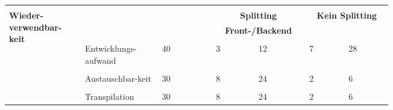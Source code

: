 \documentclass[main.tex]{subfiles} %
\begin{document}
\begin{table}[H]
\begin{tabular}{|p{0.14\linewidth}|p{0.15\linewidth}|p{0.115\linewidth}|p{0.08\linewidth}|p{0.09\linewidth}|p{0.08\linewidth}|p{0.09\linewidth}|}
        \hline
        \hline
                                                           & \multicolumn{2}{c|}{}               & \multicolumn{2}{c|}{}                        & \multicolumn{2}{c|}{}                                                                   \\[-9pt]
        \multirow{6}{4em}{\textbf{Wieder-verwendbar-keit}} & \multicolumn{2}{c|}{}               & \multicolumn{2}{c|}{\textbf{Splitting}}      & \multicolumn{2}{c|}{\textbf{Kein Splitting}}                                            \\[1pt]
                                                           & \multicolumn{2}{c|}{}               & \multicolumn{2}{c|}{\textbf{Front-/Backend}} & \multicolumn{2}{c|}{\textbf{}}                                                          \\[1pt]
        \cline{2-7}
                                                           &                                     &                                              &                                                &             &            &             \\[-9pt]
                                                           & Entwicklungs-aufwand                & 40                                           & 3                                              & 12          & 7          & 28          \\[1pt]
        \cline{2-7}
                                                           &                                     &                                              &                                                &             &            &             \\[-9pt]
                                                           & Austauschbar-keit                   & 30                                           & 8                                              & 24          & 2          & 6           \\[1pt]
        \cline{2-7}
                                                           &                                     &                                              &                                                &             &            &             \\[-9pt]
                                                           & Transpilation                       & 30                                           & 8                                              & 24          & 2          & 6           \\[1pt]

\end{tabular}
\end{table}
\end{document}
